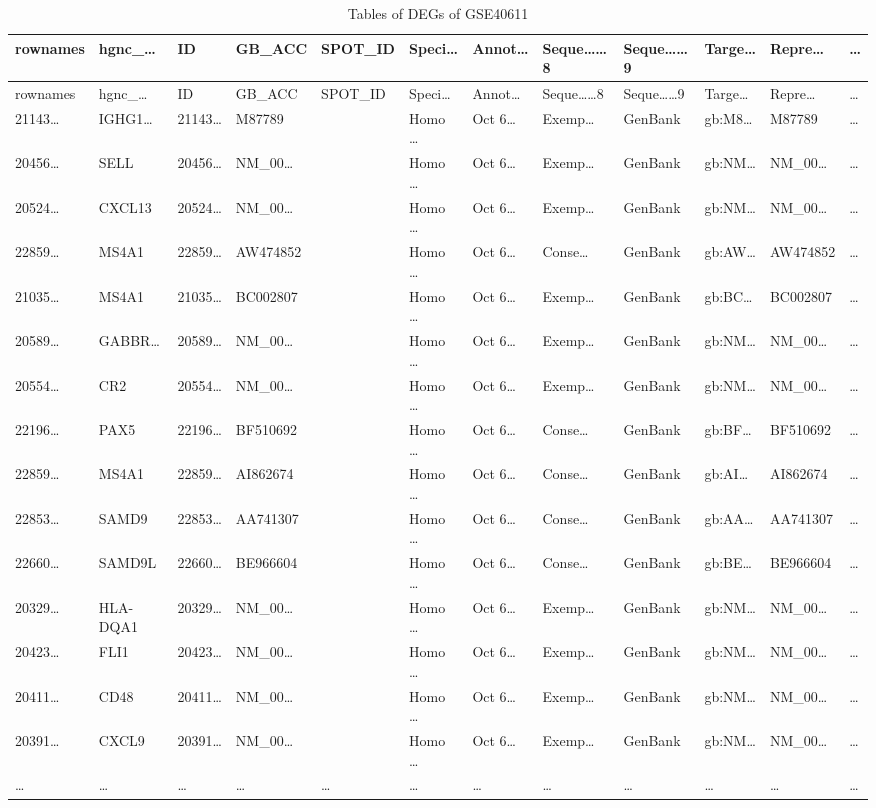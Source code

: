 \documentclass[
]{article}
\begin{document}
\begin{longtable}[]{@{}llllllllllll@{}}
\caption{\label{tab:tables-of-DEGs-of-GSE40611}Tables of DEGs of GSE40611}\tabularnewline
\toprule
rownames & hgnc\_\ldots{} & ID & GB\_ACC & SPOT\_ID & Speci\ldots{} & Annot\ldots{} & Seque\ldots\ldots8 & Seque\ldots\ldots9 & Targe\ldots{} & Repre\ldots{} & \ldots{}\tabularnewline
\midrule
\endfirsthead
\toprule
rownames & hgnc\_\ldots{} & ID & GB\_ACC & SPOT\_ID & Speci\ldots{} & Annot\ldots{} & Seque\ldots\ldots8 & Seque\ldots\ldots9 & Targe\ldots{} & Repre\ldots{} & \ldots{}\tabularnewline
\midrule
\endhead
21143\ldots{} & IGHG1\ldots{} & 21143\ldots{} & M87789 & & Homo \ldots{} & Oct 6\ldots{} & Exemp\ldots{} & GenBank & gb:M8\ldots{} & M87789 & \ldots{}\tabularnewline
20456\ldots{} & SELL & 20456\ldots{} & NM\_00\ldots{} & & Homo \ldots{} & Oct 6\ldots{} & Exemp\ldots{} & GenBank & gb:NM\ldots{} & NM\_00\ldots{} & \ldots{}\tabularnewline
20524\ldots{} & CXCL13 & 20524\ldots{} & NM\_00\ldots{} & & Homo \ldots{} & Oct 6\ldots{} & Exemp\ldots{} & GenBank & gb:NM\ldots{} & NM\_00\ldots{} & \ldots{}\tabularnewline
22859\ldots{} & MS4A1 & 22859\ldots{} & AW474852 & & Homo \ldots{} & Oct 6\ldots{} & Conse\ldots{} & GenBank & gb:AW\ldots{} & AW474852 & \ldots{}\tabularnewline
21035\ldots{} & MS4A1 & 21035\ldots{} & BC002807 & & Homo \ldots{} & Oct 6\ldots{} & Exemp\ldots{} & GenBank & gb:BC\ldots{} & BC002807 & \ldots{}\tabularnewline
20589\ldots{} & GABBR\ldots{} & 20589\ldots{} & NM\_00\ldots{} & & Homo \ldots{} & Oct 6\ldots{} & Exemp\ldots{} & GenBank & gb:NM\ldots{} & NM\_00\ldots{} & \ldots{}\tabularnewline
20554\ldots{} & CR2 & 20554\ldots{} & NM\_00\ldots{} & & Homo \ldots{} & Oct 6\ldots{} & Exemp\ldots{} & GenBank & gb:NM\ldots{} & NM\_00\ldots{} & \ldots{}\tabularnewline
22196\ldots{} & PAX5 & 22196\ldots{} & BF510692 & & Homo \ldots{} & Oct 6\ldots{} & Conse\ldots{} & GenBank & gb:BF\ldots{} & BF510692 & \ldots{}\tabularnewline
22859\ldots{} & MS4A1 & 22859\ldots{} & AI862674 & & Homo \ldots{} & Oct 6\ldots{} & Conse\ldots{} & GenBank & gb:AI\ldots{} & AI862674 & \ldots{}\tabularnewline
22853\ldots{} & SAMD9 & 22853\ldots{} & AA741307 & & Homo \ldots{} & Oct 6\ldots{} & Conse\ldots{} & GenBank & gb:AA\ldots{} & AA741307 & \ldots{}\tabularnewline
22660\ldots{} & SAMD9L & 22660\ldots{} & BE966604 & & Homo \ldots{} & Oct 6\ldots{} & Conse\ldots{} & GenBank & gb:BE\ldots{} & BE966604 & \ldots{}\tabularnewline
20329\ldots{} & HLA-DQA1 & 20329\ldots{} & NM\_00\ldots{} & & Homo \ldots{} & Oct 6\ldots{} & Exemp\ldots{} & GenBank & gb:NM\ldots{} & NM\_00\ldots{} & \ldots{}\tabularnewline
20423\ldots{} & FLI1 & 20423\ldots{} & NM\_00\ldots{} & & Homo \ldots{} & Oct 6\ldots{} & Exemp\ldots{} & GenBank & gb:NM\ldots{} & NM\_00\ldots{} & \ldots{}\tabularnewline
20411\ldots{} & CD48 & 20411\ldots{} & NM\_00\ldots{} & & Homo \ldots{} & Oct 6\ldots{} & Exemp\ldots{} & GenBank & gb:NM\ldots{} & NM\_00\ldots{} & \ldots{}\tabularnewline
20391\ldots{} & CXCL9 & 20391\ldots{} & NM\_00\ldots{} & & Homo \ldots{} & Oct 6\ldots{} & Exemp\ldots{} & GenBank & gb:NM\ldots{} & NM\_00\ldots{} & \ldots{}\tabularnewline
\ldots{} & \ldots{} & \ldots{} & \ldots{} & \ldots{} & \ldots{} & \ldots{} & \ldots{} & \ldots{} & \ldots{} & \ldots{} & \ldots{}\tabularnewline
\bottomrule
\end{longtable}
\end{document}
